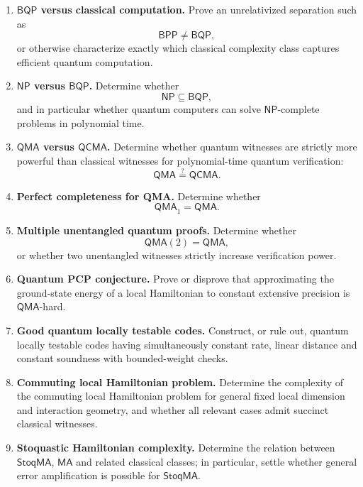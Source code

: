\documentclass{article}
\begin{document}
\begin{enumerate}[label=\textbf{A\arabic*.},leftmargin=*]

\item \precise{} \textbf{\(\mathsf{BQP}\) versus classical computation.}
Prove an unrelativized separation such as
\[
    \mathsf{BPP}\neq\mathsf{BQP},
\]
or otherwise characterize exactly which classical complexity class
captures efficient quantum computation.

\item \precise{} \textbf{\(\mathsf{NP}\) versus \(\mathsf{BQP}\).}
Determine whether
\[
    \mathsf{NP}\subseteq\mathsf{BQP},
\]
and in particular whether quantum computers can solve
\(\mathsf{NP}\)-complete problems in polynomial time.

\item \precise{} \textbf{\(\mathsf{QMA}\) versus \(\mathsf{QCMA}\).}
Determine whether quantum witnesses are strictly more powerful than
classical witnesses for polynomial-time quantum verification:
\[
    \mathsf{QMA}\stackrel{?}{=}\mathsf{QCMA}.
\]

\item \precise{} \textbf{Perfect completeness for QMA.}
Determine whether
\[
    \mathsf{QMA}_1=\mathsf{QMA}.
\]

\item \precise{} \textbf{Multiple unentangled quantum proofs.}
Determine whether
\[
    \mathsf{QMA}(2)=\mathsf{QMA},
\]
or whether two unentangled witnesses strictly increase verification
power.

\item \precise{} \textbf{Quantum PCP conjecture.}
Prove or disprove that approximating the ground-state energy of a local
Hamiltonian to constant extensive precision is
\(\mathsf{QMA}\)-hard.

\item \precise{} \textbf{Good quantum locally testable codes.}
Construct, or rule out, quantum locally testable codes having
simultaneously constant rate, linear distance and constant soundness
with bounded-weight checks.

\item \precise{} \textbf{Commuting local Hamiltonian problem.}
Determine the complexity of the commuting local Hamiltonian problem
for general fixed local dimension and interaction geometry, and whether
all relevant cases admit succinct classical witnesses.

\item \precise{} \textbf{Stoquastic Hamiltonian complexity.}
Determine the relation between \(\mathsf{StoqMA}\), \(\mathsf{MA}\) and
related classical classes; in particular, settle whether general
error amplification is possible for \(\mathsf{StoqMA}\).


\end{enumerate}
\end{document}
